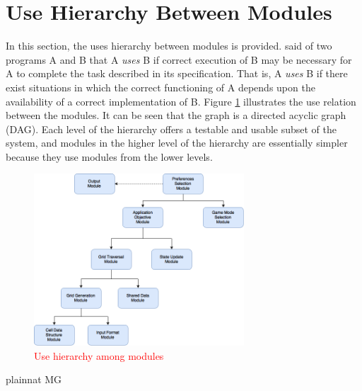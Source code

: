 \documentclass[12pt, titlepage]{article}
\begin{document}
\newpage
\section{Use Hierarchy Between Modules} \label{SecUse}
In this section, the uses hierarchy between modules is
provided. \citet{Parnas1978} said of two programs A and B that A {\em uses} B if
correct execution of B may be necessary for A to complete the task described in
its specification. That is, A {\em uses} B if there exist situations in which
the correct functioning of A depends upon the availability of a correct
implementation of B.  Figure \ref{FigUH} illustrates the use relation between
the modules. It can be seen that the graph is a directed acyclic graph
(DAG). Each level of the hierarchy offers a testable and usable subset of the
system, and modules in the higher level of the hierarchy are essentially simpler
because they use modules from the lower levels.
\begin{figure}[H]
\centering
\includegraphics[width=0.7\textwidth]{UsesHierarchy.png}
\caption{\textcolor{red}{Use hierarchy among modules}}
\label{FigUH}
\end{figure}
 {plainnat}
 {MG}
\end{document}
